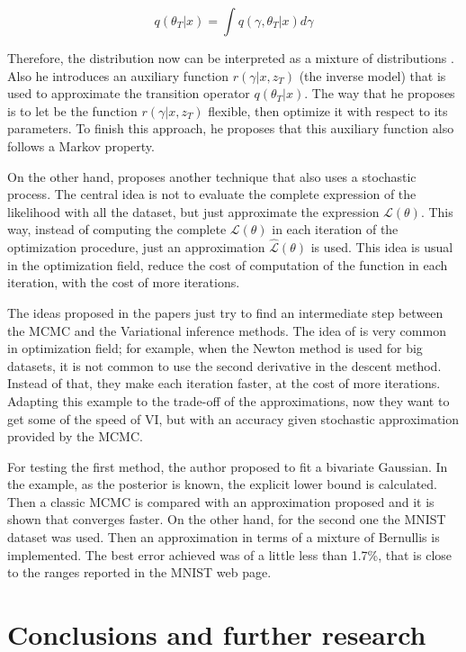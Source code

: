 \documentclass{article}
\begin{document}
\begin{equation}
q(\theta_T|x) = \int q(\gamma, \theta_T | x) d\gamma
\end{equation}

Therefore, the distribution now can be interpreted as a mixture of distributions \cite{salimans2015markov}. Also he introduces an auxiliary function $r(\gamma|x, z_T)$ (the inverse model) that is used to approximate the transition operator $q(\theta_T|x)$. The way that he proposes is to let be the function $r(\gamma|x, z_T)$ flexible, then optimize it with respect to its parameters. To finish this approach, he proposes that this auxiliary function also follows a Markov property. 

On the other hand, \cite{gal2016uncertainty} proposes another technique that also uses a stochastic process. The central idea is not to evaluate the complete expression of the likelihood with all the dataset, but just approximate the expression $\mathcal{L}(\theta)$. This way, instead of computing the complete $\mathcal{L}(\theta)$ in each iteration of the optimization procedure, just an approximation $\widehat{\mathcal{L}}(\theta)$ is used. This idea is usual in the optimization field, reduce the cost of computation of the function in each iteration, with the cost of more iterations. 

The ideas proposed in the papers just try to find an intermediate step between the MCMC and the Variational inference methods. The idea of \cite{gal2016uncertainty} is very common in optimization field; for example, when the Newton method is used for big datasets, it is not common to use the second derivative in the descent method. Instead of that, they make each iteration faster, at the cost of more iterations. Adapting this example to the trade-off of the approximations, now they want to get some of the speed of VI, but with an accuracy given stochastic approximation provided by the MCMC.

For testing the first method, the author proposed to fit a bivariate Gaussian. In the example, as the posterior is known, the explicit lower bound is calculated. Then a classic MCMC is compared with an approximation proposed and it is shown that converges faster. On the other hand, for the second one the MNIST dataset was used. Then an approximation in terms of a mixture of Bernullis is implemented. The best error achieved was of a little less than 1.7\%, that is close to the ranges reported in the MNIST web page.

\section{Conclusions and further research}
\end{document}
